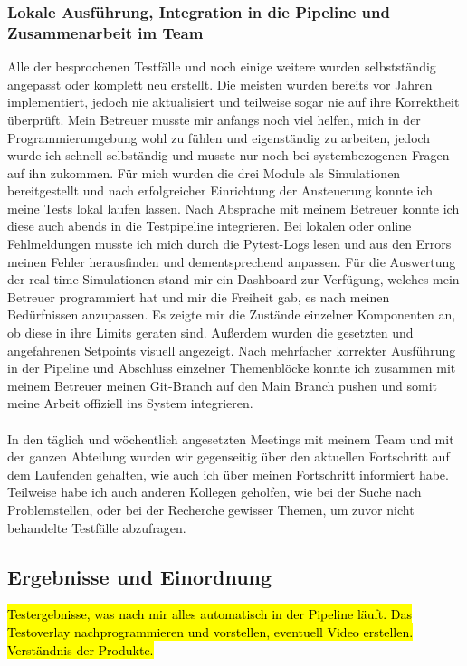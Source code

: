 \documentclass[12pt]{article} %
\begin{document}
\subsubsection{Lokale Ausführung, Integration in die Pipeline und Zusammenarbeit im Team}
Alle der besprochenen Testfälle und noch einige weitere wurden selbstständig angepasst oder komplett neu erstellt. Die meisten wurden bereits vor Jahren implementiert, jedoch nie aktualisiert und teilweise sogar nie auf ihre Korrektheit überprüft. Mein Betreuer musste mir anfangs noch viel helfen, mich in der Programmierumgebung wohl zu fühlen und eigenständig zu arbeiten, jedoch wurde ich schnell selbständig und musste nur noch bei systembezogenen Fragen auf ihn zukommen.
Für mich wurden die drei Module als Simulationen bereitgestellt und nach erfolgreicher Einrichtung der Ansteuerung konnte ich meine Tests lokal laufen lassen. Nach Absprache mit meinem Betreuer konnte ich diese auch abends in die Testpipeline integrieren. Bei lokalen oder online Fehlmeldungen musste ich mich durch die Pytest-Logs lesen und aus den Errors meinen Fehler herausfinden und dementsprechend anpassen.
Für die Auswertung der real-time Simulationen stand mir ein Dashboard zur Verfügung, welches mein Betreuer programmiert hat und mir die Freiheit gab, es nach meinen Bedürfnissen anzupassen. Es zeigte mir die Zustände einzelner Komponenten an, ob diese in ihre Limits geraten sind. Außerdem wurden die gesetzten und angefahrenen Setpoints visuell angezeigt.
Nach mehrfacher korrekter Ausführung in der Pipeline und Abschluss einzelner Themenblöcke konnte ich zusammen mit meinem Betreuer meinen Git-Branch auf den Main Branch pushen und somit meine Arbeit offiziell ins System integrieren.
\\
\\

In den täglich und wöchentlich angesetzten Meetings mit meinem Team und mit der ganzen Abteilung wurden wir gegenseitig über den aktuellen Fortschritt auf dem Laufenden gehalten, wie auch ich über meinen Fortschritt informiert habe.
Teilweise habe ich auch anderen Kollegen geholfen, wie bei der Suche nach Problemstellen, oder bei der Recherche gewisser Themen, um zuvor nicht behandelte Testfälle abzufragen. 

\subsection{Ergebnisse und Einordnung}
\hl{Testergebnisse, was nach mir alles automatisch in der Pipeline läuft.
Das Testoverlay nachprogrammieren und vorstellen, eventuell Video erstellen.
Verständnis der Produkte.}
\end{document}
